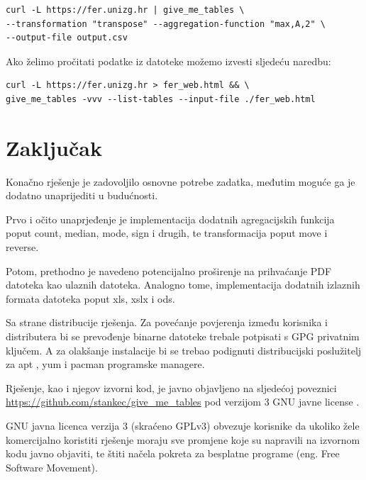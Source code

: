 \documentclass[times, utf8, zavrsni]{fer}
\begin{document}
\begin{lstlisting}
curl -L https://fer.unizg.hr | give_me_tables \
--transformation "transpose" --aggregation-function "max,A,2" \
--output-file output.csv
\end{lstlisting}

Ako želimo pročitati podatke iz datoteke možemo izvesti sljedeću naredbu:

\begin{lstlisting}
curl -L https://fer.unizg.hr > fer_web.html && \
give_me_tables -vvv --list-tables --input-file ./fer_web.html
\end{lstlisting}



\chapter{Zaključak}

Konačno rješenje je zadovoljilo osnovne potrebe zadatka, međutim moguće ga je
dodatno unaprijediti u budućnosti.

Prvo i očito unaprjeđenje je implementacija dodatnih agregacijskih funkcija
poput count, median, mode, sign i drugih, te transformacija poput move i
reverse.

Potom, prethodno je navedeno potencijalno proširenje na prihvaćanje PDF
datoteka kao ulaznih datoteka. Analogno tome, implementacija dodatnih
izlaznih formata datoteka poput xls, xslx i ods.

Sa strane distribucije rješenja. Za povećanje povjerenja između korisnika i
distributera bi se prevođenje binarne datoteke trebale potpisati s GPG
privatnim ključem. A za olakšanje instalacije bi se trebao podignuti
distribucijski poslužitelj za apt \cite{apt_wiki}, yum \cite{yum_wiki} i
pacman \cite{pacman_wiki} programske managere.

Rješenje, kao i njegov izvorni kod, je javno objavljeno na sljedećoj
poveznici \url{https://github.com/stankec/give_me_tables} pod verzijom 3 GNU
javne license \cite{gplv3_license}.

GNU javna licenca verzija 3 (skraćeno GPLv3) obvezuje korisnike da ukoliko
žele komercijalno koristiti rješenje moraju sve promjene koje su napravili na
izvornom kodu javno objaviti, te štiti načela pokreta za besplatne programe
\cite{free_software_movement_manifesto} (eng. Free Software Movement).




\end{document}
